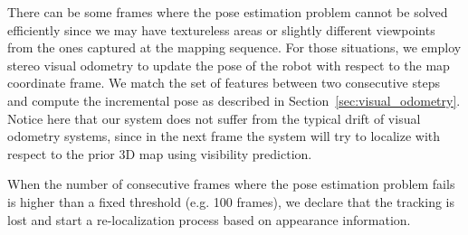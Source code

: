 There can be some frames where the pose estimation problem cannot be
solved efficiently since we may have textureless areas or slightly
different viewpoints from the ones captured at the mapping
sequence. For those situations, we employ stereo visual odometry to
update the pose of the robot with respect to the map coordinate
frame. We match the set of features between two consecutive steps and
compute the incremental pose as described in
Section~\ref{sec:visual_odometry}. Notice here that our system does
not suffer from the typical drift of visual odometry systems, since in
the next frame the system will try to localize with respect to the
prior 3D map using visibility prediction.

When the number of consecutive frames where the pose estimation
problem fails is higher than a fixed threshold (e.g. 100 frames), we
declare that the tracking is lost and start a re-localization process
based on appearance information.


